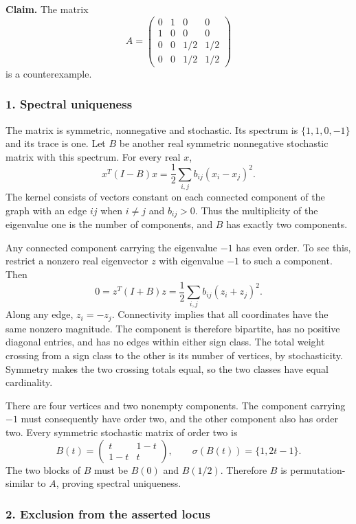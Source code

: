\documentclass[10pt,a4paper]{article}
\begin{document}
\textbf{Claim.} The matrix \[
A=\begin{pmatrix}
0&1&0&0\\
1&0&0&0\\
0&0&1/2&1/2\\
0&0&1/2&1/2
\end{pmatrix}
\] is a counterexample.

\subsubsection{1. Spectral uniqueness}\label{spectral-uniqueness}

The matrix is symmetric, nonnegative and stochastic. Its spectrum is
\(\{1,1,0,-1\}\) and its trace is one. Let \(B\) be another real
symmetric nonnegative stochastic matrix with this spectrum. For every
real \(x\), \[
x^T(I-B)x=\frac12\sum_{i,j}b_{ij}(x_i-x_j)^2.
\] The kernel consists of vectors constant on each connected component
of the graph with an edge \(ij\) when \(i\ne j\) and \(b_{ij}>0\). Thus
the multiplicity of the eigenvalue one is the number of components, and
\(B\) has exactly two components.

Any connected component carrying the eigenvalue \(-1\) has even order.
To see this, restrict a nonzero real eigenvector \(z\) with eigenvalue
\(-1\) to such a component. Then \[
0=z^T(I+B)z=\frac12\sum_{i,j}b_{ij}(z_i+z_j)^2.
\] Along any edge, \(z_i=-z_j\). Connectivity implies that all
coordinates have the same nonzero magnitude. The component is therefore
bipartite, has no positive diagonal entries, and has no edges within
either sign class. The total weight crossing from a sign class to the
other is its number of vertices, by stochasticity. Symmetry makes the
two crossing totals equal, so the two classes have equal cardinality.

There are four vertices and two nonempty components. The component
carrying \(-1\) must consequently have order two, and the other
component also has order two. Every symmetric stochastic matrix of order
two is \[
B(t)=\begin{pmatrix}t&1-t\\1-t&t\end{pmatrix},
\qquad \sigma(B(t))=\{1,2t-1\}.
\] The two blocks of \(B\) must be \(B(0)\) and \(B(1/2)\). Therefore
\(B\) is permutation-similar to \(A\), proving spectral uniqueness.

\subsubsection{2. Exclusion from the asserted
locus}\label{exclusion-from-the-asserted-locus}
\end{document}
